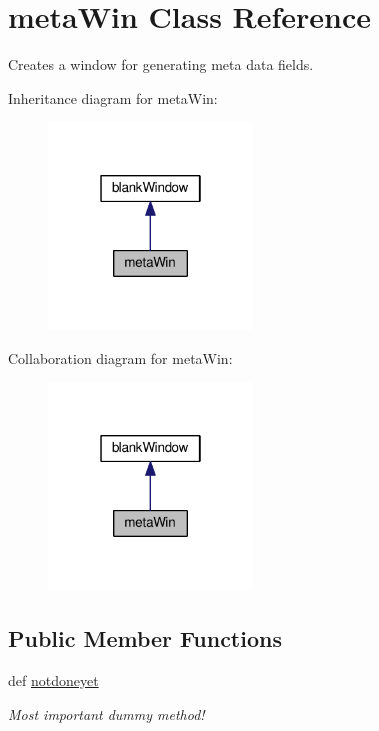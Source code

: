 \hypertarget{classgui_1_1window3a_1_1metaWin}{\section{meta\-Win Class Reference}
\label{classgui_1_1window3a_1_1metaWin}
}


Creates a window for generating meta data fields.  




Inheritance diagram for meta\-Win\-:\nopagebreak
\begin{figure}[H]
\begin{center}
\leavevmode
\includegraphics[width=154pt]{classgui_1_1window3a_1_1metaWin__inherit__graph}
\end{center}
\end{figure}


Collaboration diagram for meta\-Win\-:\nopagebreak
\begin{figure}[H]
\begin{center}
\leavevmode
\includegraphics[width=154pt]{classgui_1_1window3a_1_1metaWin__coll__graph}
\end{center}
\end{figure}
\subsection*{Public Member Functions}
\begin{DoxyCompactItemize}
\item 
\hypertarget{classgui_1_1window3a_1_1metaWin_a615f3073891733337c33f599f89ec7ef}{def \hyperlink{classgui_1_1window3a_1_1metaWin_a615f3073891733337c33f599f89ec7ef}{notdoneyet}}\label{classgui_1_1window3a_1_1metaWin_a615f3073891733337c33f599f89ec7ef}

\begin{DoxyCompactList}\small\item\em Most important dummy method! \end{DoxyCompactList}\end{DoxyCompactItemize}


